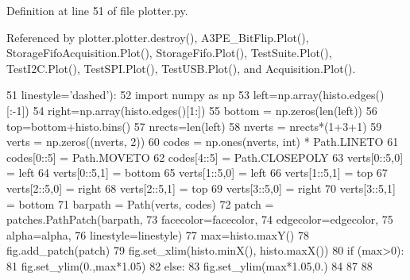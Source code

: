 Definition at line 51 of file plotter.\+py.



Referenced by plotter.\+plotter.\+destroy(), A3\+P\+E\+\_\+\+Bit\+Flip.\+Plot(), Storage\+Fifo\+Acquisition.\+Plot(), Storage\+Fifo.\+Plot(), Test\+Suite.\+Plot(), Test\+I2\+C.\+Plot(), Test\+S\+P\+I.\+Plot(), Test\+U\+S\+B.\+Plot(), and Acquisition.\+Plot().


\begin{DoxyCode}
51         linestyle=\textcolor{stringliteral}{'dashed'}):
52         \textcolor{keyword}{import} numpy \textcolor{keyword}{as} np
53         left=np.array(histo.edges()[:-1])
54         right=np.array(histo.edges()[1:])
55         bottom = np.zeros(len(left))
56         top=bottom+histo.bins()
57         nrects=len(left)
58         nverts = nrects*(1+3+1)
59         verts = np.zeros((nverts, 2))
60         codes = np.ones(nverts, int) * Path.LINETO
61         codes[0::5] = Path.MOVETO
62         codes[4::5] = Path.CLOSEPOLY
63         verts[0::5,0] = left
64         verts[0::5,1] = bottom
65         verts[1::5,0] = left
66         verts[1::5,1] = top
67         verts[2::5,0] = right
68         verts[2::5,1] = top
69         verts[3::5,0] = right
70         verts[3::5,1] = bottom
71         barpath = Path(verts, codes)
72         patch = patches.PathPatch(barpath,
73                                   facecolor=facecolor,
74                                   edgecolor=edgecolor,
75                                   alpha=alpha,
76                                   linestyle=linestyle)
77         max=histo.maxY()
78         fig.add\_patch(patch)
79         fig.set\_xlim(histo.minX(), histo.maxX())
80         \textcolor{keywordflow}{if} (max>0):
81                 fig.set\_ylim(0.,max*1.05)
82         \textcolor{keywordflow}{else}:
83                 fig.set\_ylim(max*1.05,0.)
84                 
87 
88 
\end{DoxyCode}
